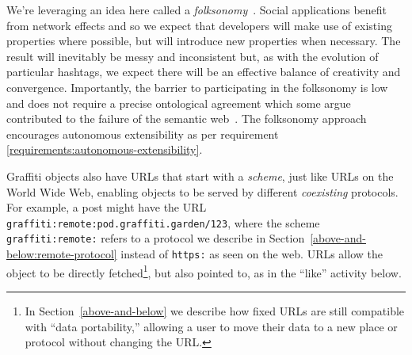 We're leveraging an idea here called a \emph{folksonomy}~\cite{folksonomy}.
Social applications
benefit from network effects and so we expect that developers will make use of
existing properties where possible,
but will introduce new properties when necessary.
The result will inevitably be messy and inconsistent but, as with the evolution of
particular hashtags, we expect there will be an effective balance of creativity and convergence.
Importantly, the barrier to participating in the folksonomy is low
and does not require a precise ontological agreement
which some argue contributed to the failure of the semantic
web~\cite{semanticwebtwodecades}.
The folksonomy approach encourages autonomous extensibility
as per requirement \ref{requirements:autonomous-extensibility}.


Graffiti objects also have URLs that
start with a \emph{scheme}, just like URLs on the World Wide Web,
enabling objects to be served by different \emph{coexisting} protocols.
For example, a post might have the URL
\texttt{graffiti\allowbreak:remote\allowbreak:pod\allowbreak.graffiti\allowbreak.garden\allowbreak/123},
where the scheme \texttt{graffiti:remote:} refers to a protocol we describe
in Section~\ref{above-and-below:remote-protocol}
instead of \texttt{https:} as seen on the web.
URLs allow the object to be directly fetched\footnote{
    In Section~\ref{above-and-below} we describe how fixed URLs
    are still compatible with ``data portability,'' allowing
    a user to move their data to a new place or protocol without
    changing the URL.
}, but also pointed to, as in the
``like'' activity below.

